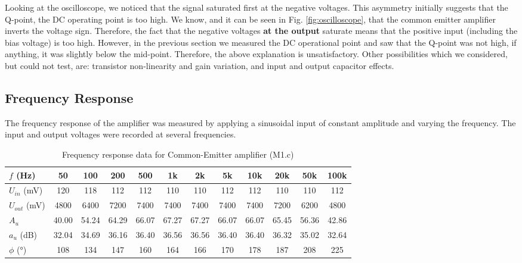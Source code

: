 \documentclass[12pt,a4paper]{article}
\begin{document}
Looking at the oscilloscope, we noticed that the signal saturated first at the negative voltages. This asymmetry initially suggests that the Q-point, the DC operating point is too high. We know, and it can be seen in Fig. \ref{fig:oscilloscope}, that the common emitter amplifier inverts the voltage sign. Therefore, the fact that the negative voltages \textbf{at the output} saturate means that the positive input (including the bias voltage) is too high. However, in the previous section we measured the DC operational point and saw that the Q-point was not high, if anything, it was slightly below the mid-point. Therefore, the above explanation is unsatisfactory. Other possibilities which we considered, but could not test, are: transistor non-linearity and gain variation, and input and output capacitor effects. 


\subsection{Frequency Response}
The frequency response of the amplifier was measured by applying a sinusoidal input of constant amplitude and varying the frequency. The input and output voltages were recorded at several frequencies.

\begin{table}[H]
    \centering
    \caption{Frequency response data for Common-Emitter amplifier (M1.c)}\label{tab:freq_response_m1}\footnotemark
    \begin{tabular}{lccccccccccc}
        \toprule
        {$f$ (\si{Hz})} & 50 & 100 & 200 & 500 & 1k & 2k & 5k & 10k & 20k & 50k & 100k \\
        \midrule
        {$U_{in}$ (\si{mV})} & 120 & 118 & 112 & 112 & 110 & 110 & 112 & 112 & 110 & 110 & 112 \\
        {$U_{out}$ (\si{mV})} & 4800 & 6400 & 7200 & 7400 & 7400 & 7400 & 7400 & 7400 & 7200 & 6200 & 4800 \\
        {$A_u$} & 40.00 & 54.24 & 64.29 & 66.07 & 67.27 & 67.27 & 66.07 & 66.07 & 65.45 & 56.36 & 42.86 \\
        {$a_u$ (\si{dB})} & 32.04 & 34.69 & 36.16 & 36.40 & 36.56 & 36.56 & 36.40 & 36.40 & 36.32 & 35.02 & 32.64 \\
        {$\phi$ (\si{\degree})} & 108 & 134 & 147 & 160 & 164 & 166 & 170 & 178 & 187 & 208 & 225 \\
        \bottomrule
    \end{tabular}
\end{table}
\end{document}
